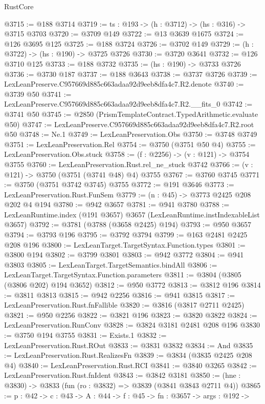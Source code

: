 \begin{lexlean}{RustCore}
\begin{coremodule}
@3715 := @188 @3714
@3719 := {ts : @193} -> (h : @3712) -> (hs : @316) -> @3715 @3703
@3720 := @3709 @149
@3722 := @13 @3639 @1675
@3724 := @126 @3695 @125
@3725 := @188 @3724
@3726 := @3702 @149
@3729 := (h : @3722) -> (hs : @190) -> @3725 @3726
@3730 := @3720 @3641
@3732 := @126 @3710 @125
@3733 := @188 @3732
@3735 := (hs : @190) -> @3733 @3726
@3736 := @3730 @187
@3737 := @188 @3643
@3738 := @3737 @3726
@3739 := LexLeanPreserve.C957669d885c663adaa92d9eeb8dfa4c7.R2.denote
@3740 := @3739 @50
@3741 := LexLeanPreserve.C957669d885c663adaa92d9eeb8dfa4c7.R2.__fits_0
@3742 := @3741 @50
@3745 := @2850 (PrismTemplateContract.TypedArithmetic.evaluate @50)
@3747 := LexLeanPreserve.C957669d885c663adaa92d9eeb8dfa4c7.R2.root @50
@3748 := Ne.{1}
@3749 := LexLeanPreservation.Obs
@3750 := @3748 @3749
@3751 := LexLeanPreservation.Rel
@3754 := @3750 (@3751 @50 @4)
@3755 := LexLeanPreservation.Obs.stuck
@3758 := (f : @2256) -> (v : @121) -> @3754 @3755
@3760 := LexLeanPreservation.Rust.rel_ne_stuck @3742
@3766 := (v : @121) -> @3750 (@3751 (@3741 @48) @4) @3755
@3767 := @3760 @3745
@3771 := @3750 (@3751 @3742 @3745) @3755
@3772 := @191 @3646
@3773 := LexLeanPreservation.Rust.FunSem
@3779 := (n : @45) -> @3773 @2425 @208 @202 @4 @194
@3780 := @942 @3657
@3781 := @941 @3780
@3788 := LexLeanRuntime.index (@191 @3657) @3657 (LexLeanRuntime.instIndexableList @3657)
@3792 := @3781 (@3788 (@3658 @2425) @194)
@3793 := @950 @3657
@3794 := @3793 @196
@3795 := @3792 @3794
@3799 := @163 @2481 @2425 @208 @196
@3800 := LexLeanTarget.TargetSyntax.Function.types
@3801 := @3800 @194
@3802 := @3799 @3801
@3803 := @942 @3772
@3804 := @941 @3803
@3805 := LexLeanTarget.TargetSemantics.bindAll
@3806 := LexLeanTarget.TargetSyntax.Function.parameters
@3811 := @3804 (@3805 (@3806 @202) @194 @3652)
@3812 := @950 @3772
@3813 := @3812 @196
@3814 := @3811 @3813
@3815 := @942 @2256
@3816 := @941 @3815
@3817 := LexLeanPreservation.Rust.fnFallible
@3820 := @3816 (@3817 @2711 @2425)
@3821 := @950 @2256
@3822 := @3821 @196
@3823 := @3820 @3822
@3824 := LexLeanPreservation.RunConv
@3828 := @3824 @3181 @2481 @208 @196
@3830 := @3750 @194 @3755
@3831 := Exists.{1}
@3832 := LexLeanPreservation.Rust.ROut
@3833 := @3831 @3832
@3834 := And
@3835 := LexLeanPreservation.Rust.RealizesFn
@3839 := @3834 (@3835 @2425 @208 @4)
@3840 := LexLeanPreservation.Rust.RCI
@3841 := @3840 @3265
@3842 := LexLeanPreservation.Rust.fnIdent
@3843 := @3842 @3181
@3850 := (hne : @3830) -> @3833 (fun (ro : @3832) => @3839 (@3841 @3843 @2711 @4))
@3865 := {p : @42} ->
  {c : @43} ->
  {A : @44} ->
  {f : @45} ->
  {fn : @3657} ->
  {args : @192} ->

\end{coremodule}
\end{lexlean}
